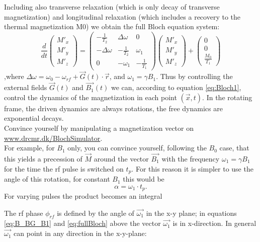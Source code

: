 \documentclass[a4paper,12pt]{extarticle}
\begin{document}
 Including also transverse relaxation (which is only decay of transverse magnetization) and longitudinal relaxation (which includes a recovery to the thermal magnetization M0) we obtain the full Bloch equation system:
\begin{equation} 
\label{eq:fullBloch}
\frac{d}{dt}\left( \begin{array}{c} M'_x\\ M'_y\\ M'_z \end{array} \right) 
=
\left( \begin{array}{ccc}
-\frac{1}{T_2}& \Delta\omega & 0\\
-\Delta\omega & -\frac{1}{T_2}& \omega_1\\
0 & -\omega_1 & -\frac{1}{T_1}
\end{array} \right)
\left( \begin{array}{c} M'_x\\ M'_y\\ M'_z \end{array} \right) 
+
\left( \begin{array}{c} 0\\ 0\\ \frac{M_0}{T_1} \end{array} \right)
 \end{equation},where $\Delta\omega = \omega_0-\omega_{rf} + \vec{G}(t)\cdot\vec{r} $, and $\omega_1=\gamma B_1$. 
Thus by controlling the external fields $\vec{G}(t)$ and $\vec {B_1}(t)$ we can, according to equation \eqref{eq:Bloch1}, control the dynamics of the magnetization in each point $(\vec{x},t)$.  In the rotating frame, the driven dynamics are always rotations, the free dynamics are exponential decays.\\
Convince yourself by manipulating a magnetization vector on \href{http://www.drcmr.dk/BlochSimulator/}{www.drcmr.dk/BlochSimulator}.\\
For example, for $B_1$ only, you can convince yourself, following the $B_0$ case, that this yields a precession of $\vec{M}$ around the vector $\vec{B_1}$ with the frequency $\omega_1=\gamma B_1$ for the time the rf pulse is switched on $t_p$. For this reason it is simpler to use the angle of this rotation, for constant $B_1$ this would be
\begin{equation} 
\alpha=\omega_1\cdot t_p.
\end{equation}
For varying pulses the product becomes an integral

The rf phase $\phi_{rf}$ is defined by the angle of $\vec{\omega_1}$ in the x-y plane; in  equations \eqref{eq:B_BG_B1} and \eqref{eq:fullBloch} above the vector $\vec{\omega_1}$ is in x-direction. In general $\vec{\omega_1}$ can point in any direction in the x-y-plane:
\end{document}
